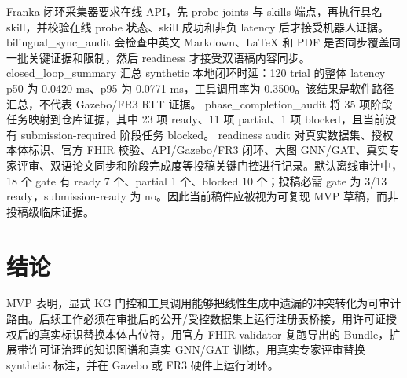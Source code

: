 \documentclass[11pt]{article}
\begin{document}
Franka 闭环采集器要求在线 API，先 probe joints 与 skills 端点，再执行具名 skill，并校验在线 probe 状态、skill 成功和非负 latency 后才接受机器人证据。
bilingual\_sync\_audit 会检查中英文 Markdown、LaTeX 和 PDF 是否同步覆盖同一批关键证据和限制，然后 readiness 才接受双语稿内容同步。
closed\_loop\_summary 汇总 synthetic 本地闭环时延：120 trial 的整体 latency p50 为 0.0420 ms、p95 为 0.0771 ms，工具调用率为 0.3500。该结果是软件路径汇总，不代表 Gazebo/FR3 RTT 证据。
phase\_completion\_audit 将 35 项阶段任务映射到仓库证据，其中 23 项 ready、11 项 partial、1 项 blocked，且当前没有 submission-required 阶段任务 blocked。
readiness audit 对真实数据集、授权本体标识、官方 FHIR 校验、API/Gazebo/FR3 闭环、大图 GNN/GAT、真实专家评审、双语论文同步和阶段完成度等投稿关键门控进行记录。默认离线审计中，18 个 gate 有 ready 7 个、partial 1 个、blocked 10 个；投稿必需 gate 为 3/13 ready，submission-ready 为 no。因此当前稿件应被视为可复现 MVP 草稿，而非投稿级临床证据。

\section{结论}
MVP 表明，显式 KG 门控和工具调用能够把线性生成中遗漏的冲突转化为可审计路由。后续工作必须在审批后的公开/受控数据集上运行注册表桥接，用许可证授权后的真实标识替换本体占位符，用官方 FHIR validator 复跑导出的 Bundle，扩展带许可证治理的知识图谱和真实 GNN/GAT 训练，用真实专家评审替换 synthetic 标注，并在 Gazebo 或 FR3 硬件上运行闭环。

\nocite{*}


\end{document}

